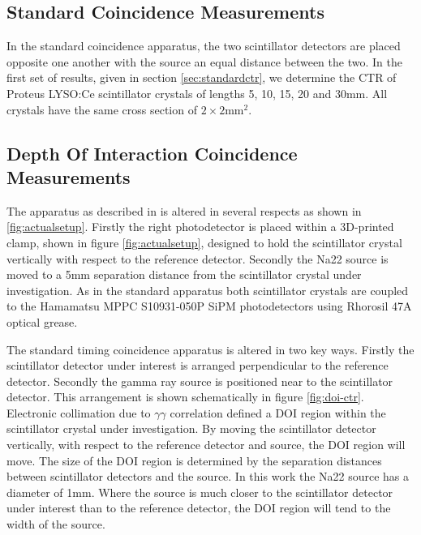 \subsection{Standard Coincidence Measurements}
In the standard coincidence apparatus, the two scintillator detectors are placed opposite one another with the source an equal distance between the two. In the first set of results, given in section \ref{sec:standardctr}, we determine the CTR of Proteus LYSO:Ce scintillator crystals of lengths 5, 10, 15, 20 and 30mm. All crystals have the same cross section of $2\times2$mm$^2$.



\subsection{Depth Of Interaction Coincidence Measurements}
The apparatus as described in \cite{arron_Meyer_Pauwels_Lecoq_2012} is altered in several respects as shown in \ref{fig:actualsetup}. Firstly the right photodetector is placed within a 3D-printed clamp, shown in figure \ref{fig:actualsetup}, designed to hold the scintillator crystal vertically with respect to the reference detector. Secondly the Na22 source is moved to a 5mm separation distance from the scintillator crystal under investigation. As in the standard apparatus both scintillator crystals are coupled to the Hamamatsu MPPC S10931-050P SiPM photodetectors using Rhorosil 47A optical grease. 

The standard timing coincidence apparatus is altered in two key ways. Firstly the scintillator detector under interest is arranged perpendicular to the reference detector. Secondly the gamma ray source is positioned near to the scintillator detector. This arrangement is shown schematically in figure \ref{fig:doi-ctr}. Electronic collimation due to $\gamma\gamma$ correlation defined a DOI region within the scintillator crystal under investigation. By moving the scintillator detector vertically, with respect to the reference detector and source, the DOI region will move. The size of the DOI region is determined by the separation distances between scintillator detectors and the source. In this work the Na22 source has a diameter of 1mm. Where the source is much closer to the scintillator detector under interest than to the reference detector, the DOI region will tend to the width of the source.


